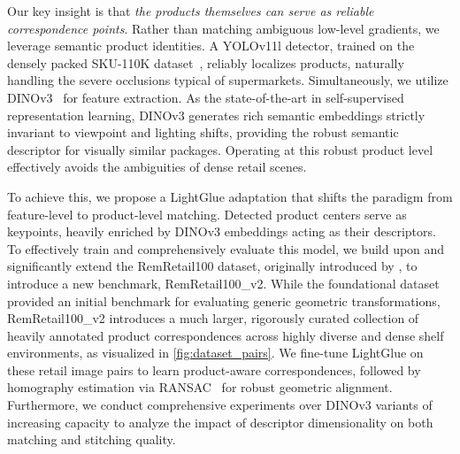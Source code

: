\documentclass[10pt,twocolumn,letterpaper]{article}
\begin{document}
Our key insight is that \emph{the products themselves can serve as reliable correspondence points}. Rather than matching ambiguous low-level gradients, we leverage semantic product identities. A YOLOv11l detector, trained on the densely packed SKU-110K dataset~\cite{sku110k}, reliably localizes products, naturally handling the severe occlusions typical of supermarkets. Simultaneously, we utilize DINOv3~\cite{dinov3} for feature extraction. As the state-of-the-art in self-supervised representation learning, DINOv3 generates rich semantic embeddings strictly invariant to viewpoint and lighting shifts, providing the robust semantic descriptor for visually similar packages. Operating at this robust product level effectively avoids the ambiguities of dense retail scenes.

To achieve this, we propose a LightGlue adaptation that shifts the paradigm from feature-level to product-level matching. Detected product centers serve as keypoints, heavily enriched by DINOv3 embeddings acting as their descriptors. To effectively train and comprehensively evaluate this model, we build upon and significantly extend the RemRetail100 dataset, originally introduced by \cite{image_stitching_eval}, to introduce a new benchmark, RemRetail100\_v2. While the foundational dataset provided an initial benchmark for evaluating generic geometric transformations, RemRetail100\_v2 introduces a much larger, rigorously curated collection of heavily annotated product correspondences across highly diverse and dense shelf environments, as visualized in \cref{fig:dataset_pairs}. We fine-tune LightGlue on these retail image pairs to learn product-aware correspondences, followed by homography estimation via RANSAC~\cite{ransac} for robust geometric alignment. Furthermore, we conduct comprehensive experiments over DINOv3 variants of increasing capacity to analyze the impact of descriptor dimensionality on both matching and stitching quality.
\end{document}
